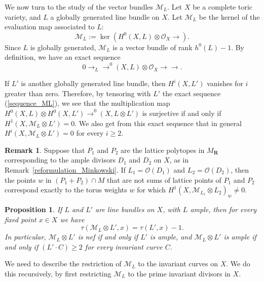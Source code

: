 \documentclass[12pt]{amsart}
\newtheorem{proposition}[lemma]{Proposition}
\theoremstyle{definition}
\newtheorem{remark}[lemma]{Remark}
\theoremstyle{remark}
\begin{document}
\bigskip

We now turn to the study of the vector bundles ${\mathcal{M}}_L$.
Let $X$ be a complete toric variety, and $L$ a globally generated
line bundle on $X$. Let ${\mathcal{M}}_L$ be the kernel of the evaluation map
associated to $L$:
$${\mathcal{M}}_L:=\ker\left(H^0(X,L)\otimes{\mathcal{O}}_X{\xrightarrow{\ \ }}\right).$$
Since $L$ is globally generated, ${\mathcal{M}}_L$ is a vector bundle of rank
$h^0(L)-1$. By definition, we have an exact sequence
\begin{equation}\label{sequence_ML}
0{\xrightarrow{\ \ }}_L{\xrightarrow{\ \ }}^0(X,L)\otimes{\mathcal{O}}_X{\xrightarrow{\ \ }}{\xrightarrow{\ \ }}.
\end{equation}

If $L'$ is another globally generated line bundle, then $H^i(X,L')$ vanishes for $i$ greater than zero.  Therefore, by tensoring with
$L'$ the exact sequence (\ref{sequence_ML}),
we see that the multiplication map $H^0(X,L)\otimes H^0(X,L'){\xrightarrow{\ \ }}^0(X,L\otimes L')$ is surjective if and only if $H^1(X,{\mathcal{M}}_L\otimes
L')=0$. We also  get from this exact sequence that in general
$H^i(X,{\mathcal{M}}_L\otimes L')=0$ for every $i\geq 2$.

\begin{remark}
Suppose that $P_1$ and $P_2$ are the lattice polytopes in $M_{{\mathbf R}}$ 
corresponding to the ample divisors $D_1$ and $D_2$ on $X$, as in
Remark~\ref{reformulation_Minkowski}. If $L_1={\mathcal{O}}(D_1)$ and $L_2={\mathcal{O}}(D_2)$, then
the points $w$ in $(P_1+P_2)\cap M$ that are not sums of lattice points 
of $P_1$ and $P_2$ correspond exactly to the torus weights $w$ for
which $H^1(X,{\mathcal{M}}_{L_1}\otimes L_2)_w \neq 0$.
\end{remark}

\begin{proposition}\label{prop1}
If $L$ and $L'$ are line bundles on $X$, with $L$ ample, then
 for every fixed point $x \in X$ we have
\[
\tau({\mathcal{M}}_L \otimes L', x) = \tau(L',x) - 1.
\]
In particular,  ${\mathcal{M}}_L \otimes L'$ is nef if and only if $L'$ is ample, and 
 ${\mathcal{M}}_L \otimes L'$ is ample if and only if
$(L' \cdot C) \geq 2$ for every invariant curve $C$.
\end{proposition}

We need to describe the restriction of ${\mathcal{M}}_L$ to the invariant curves on $X$. We do this recursively,
by first restricting ${\mathcal{M}}_L$ to the prime invariant divisors in $X$.
\end{document}
